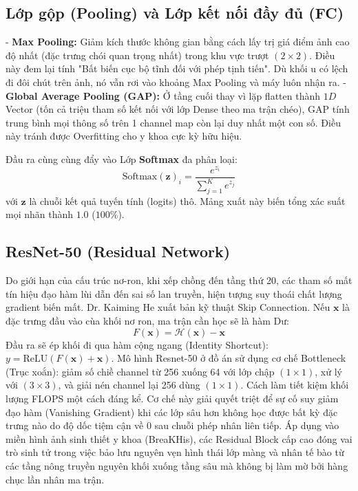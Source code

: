 \documentclass[conference,a4paper]{IEEEtran}
\begin{document}
\subsection{Lớp gộp (Pooling) và Lớp kết nối đầy đủ (FC)}
- \textbf{Max Pooling:} Giảm kích thước không gian bằng cách lấy trị giá điểm ảnh cao độ nhất (đặc trưng chói quan trọng nhất) trong khu vực trượt $(2 \times 2)$. Điều này đem lại tính "Bất biến cục bộ tĩnh đối với phép tịnh tiến". Dù khối u có lệch đi đôi chút trên ảnh, nó vẫn rơi vào khoảng Max Pooling và máy luôn nhận ra.
- \textbf{Global Average Pooling (GAP):} Ở tầng cuối thay vì lặp flatten thành $1D$ Vector (tốn cả triệu tham số kết nối với lớp Dense theo ma trận chéo), GAP tính trung bình mọi thông số trên 1 channel map còn lại duy nhất một con số. Điều này tránh được Overfitting cho y khoa cực kỳ hữu hiệu.

Đầu ra cùng cùng đẩy vào Lớp \textbf{Softmax} đa phân loại:
\begin{equation}
\text{Softmax}(\mathbf{z})_i = \frac{e^{z_i}}{\sum_{j=1}^{K} e^{z_j}}
\end{equation}
với $\mathbf{z}$ là chuỗi kết quả tuyến tính (logits) thô. Mảng xuất này biến tổng xác suất mọi nhãn thành $1.0$ ($100\%$).


\subsection{ResNet-50 (Residual Network)}
Do giới hạn của cấu trúc nơ-ron, khi xếp chồng đến tầng thứ 20, các tham số mất tín hiệu đạo hàm lùi dẫn đến sai số lan truyền, hiện tượng suy thoái chất lượng gradient biến mất. Dr. Kaiming He \cite{resnet} xuất bản kỹ thuật Skip Connection.
Nếu $\mathbf{x}$ là đặc trưng đầu vào cùa khối nơ ron, ma trận cần học sẽ là hàm Dư:
\begin{equation}
F(\mathbf{x}) = \mathcal{H}(\mathbf{x}) - \mathbf{x}
\end{equation}
Đầu ra sẽ ép khối đi qua hàm cộng ngang (Identity Shortcut): $y = \text{ReLU}(F(\mathbf{x}) + \mathbf{x})$.
Mô hình Resnet-50 ở đồ án sử dụng cơ chế Bottleneck (Trục xoắn): giảm số chiề channel từ 256 xuống 64 với lớp chập $(1 \times 1)$, xử lý với $(3 \times 3)$, và giải nén channel lại 256 dùng $(1 \times 1)$. Cách làm tiết kiệm khối lượng FLOPS một cách đáng kể. Cơ chế này giải quyết triệt để sự cố suy giảm đạo hàm (Vanishing Gradient) khi các lớp sâu hơn không học được bất kỳ đặc trưng nào do độ dốc tiệm cận về 0 sau chuỗi phép nhân liên tiếp. Áp dụng vào miền hình ảnh sinh thiết y khoa (BreaKHis), các Residual Block cấp cao đóng vai trò sinh tử trong việc bảo lưu nguyên vẹn hình thái lớp màng và nhân tế bào từ các tầng nông truyền nguyên khối xuống tầng sâu mà không bị làm mờ bởi hàng chục lần nhân ma trận.
\end{document}
